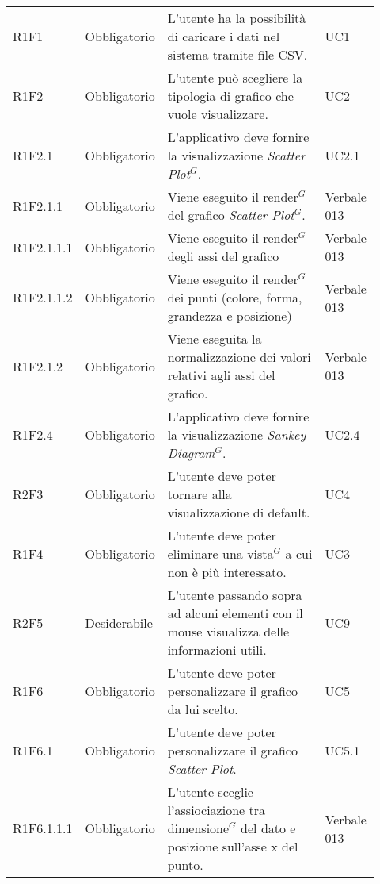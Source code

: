 {\begin{longtable}{p{0.12\linewidth}p{0.15\linewidth}p{0.50\linewidth}p{0.15\linewidth}}
    \rowcolor[RGB]{216, 235, 171}
    R1F1 & Obbligatorio & L'utente ha la possibilità di caricare i dati nel sistema tramite file CSV. & UC1\\
    \rowcolor[RGB]{233, 245, 206}
    R1F2 & Obbligatorio & L'utente può scegliere la tipologia di grafico che vuole visualizzare. & UC2\\
    \rowcolor[RGB]{216, 235, 171}
    R1F2.1 & Obbligatorio & L'applicativo deve fornire la visualizzazione \textit{Scatter Plot$^{G}$}. & UC2.1\\
    \rowcolor[RGB]{233, 245, 206}
    R1F2.1.1 & Obbligatorio & Viene eseguito il render$^{G}$ del grafico \textit{Scatter Plot$^{G}$}. & Verbale 013\\
    \rowcolor[RGB]{216, 235, 171}
    R1F2.1.1.1 & Obbligatorio & Viene eseguito il render$^{G}$ degli assi del grafico & Verbale 013\\
    \rowcolor[RGB]{233, 245, 206}
    R1F2.1.1.2 & Obbligatorio & Viene eseguito il render$^{G}$ dei punti (colore, forma, grandezza e posizione)& Verbale 013\\
    \rowcolor[RGB]{216, 235, 171}
    R1F2.1.2 & Obbligatorio & Viene eseguita la normalizzazione dei valori relativi agli assi del grafico. & Verbale 013\\
    \rowcolor[RGB]{233, 245, 206}
    R1F2.4 & Obbligatorio & L'applicativo deve fornire la visualizzazione \textit{Sankey Diagram$^{G}$}. & UC2.4\\
    \rowcolor[RGB]{216, 235, 171}
    R2F3 & Obbligatorio & L'utente deve poter tornare alla visualizzazione di default. & UC4\\
    \rowcolor[RGB]{233, 245, 206}
    R1F4 & Obbligatorio & L'utente deve poter eliminare una vista$^{G}$ a cui non è più interessato. & UC3\\
    \rowcolor[RGB]{216, 235, 171}
    R2F5 & Desiderabile & L'utente passando sopra ad alcuni elementi con il mouse visualizza delle informazioni utili. & UC9\\
    \rowcolor[RGB]{233, 245, 206}
    R1F6 & Obbligatorio & L'utente deve poter personalizzare il grafico da lui scelto. & UC5\\
    \rowcolor[RGB]{216, 235, 171}
    R1F6.1 & Obbligatorio & L'utente deve poter personalizzare il grafico \textit{Scatter Plot}. & UC5.1\\
    \rowcolor[RGB]{233, 245, 206}
    R1F6.1.1.1 & Obbligatorio & L'utente sceglie l'assiociazione tra dimensione$^{G}$ del dato e posizione sull'asse x del punto.& Verbale 013\\

\end{longtable}}
